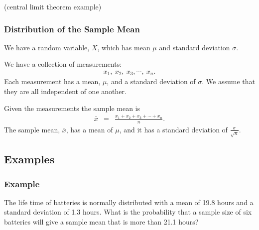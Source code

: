 \begin{frame}
  (central limit theorem example)
\end{frame}


\begin{frame}
  \frametitle{Distribution of the Sample Mean}

  We have a random variable, $X$, which has mean $\mu$ and standard
  deviation $\sigma.$

  We have a collection of measurements:
  \begin{eqnarray*}
    x_1,~x_2,~x_3,\cdots,~x_n.
  \end{eqnarray*}
  Each measurement has a mean, $\mu$, and a standard deviation of
  $\sigma$. We assume that they are all independent of one another.
  
  Given the measurements the sample mean is
  \begin{eqnarray*}
    \bar{x} & = & \frac{x_1+x_2+x_3+\cdots+x_n}{n}.
  \end{eqnarray*}
  The sample mean, $\bar{x}$,  has a mean of $\mu$, and it has a
  standard deviation of $\frac{\sigma}{\sqrt{n}}$.

\end{frame}



\subsection{Examples}

\begin{frame}
  \frametitle{Example}

  The life time of batteries is normally distributed with a mean of
  19.8 hours and a standard deviation of 1.3 hours. What is the
  probability that a sample size of six batteries will give a sample
  mean that is more than 21.1 hours?

  \vfill


  \vfill

\end{frame}


